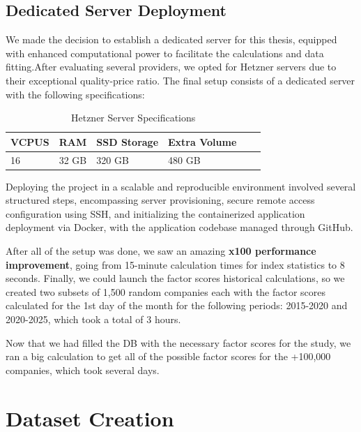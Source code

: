 \documentclass[11pt,english,a4paper,hidelinks]{book}
\begin{document}
\subsection{Dedicated Server Deployment}
\noindent We made the decision to establish a dedicated server for this thesis, equipped with enhanced computational power to facilitate the calculations and data fitting.After evaluating several providers, we opted for Hetzner servers due to their exceptional quality-price ratio. The final setup consists of a dedicated server with the following specifications:

\begin{table}[H]
    \centering
    \begin{tabular}{|l|l|l|l|l|l|}
        \hline
        \textbf{VCPUS} & \textbf{RAM} & \textbf{SSD Storage} & \textbf{Extra Volume} \\
        \hline
        16 & 32 GB & 320 GB & 480 GB \\
        \hline
    \end{tabular}
    \caption{Hetzner Server Specifications}
    \label{tab:hetzner_server_specs}
\end{table}

\noindent Deploying the project in a scalable and reproducible environment involved several structured steps, encompassing server provisioning, secure remote access configuration using SSH, and initializing the containerized application deployment via Docker, with the application codebase managed through GitHub.

\vspace{0.5cm}  
\noindent After all of the setup was done, we saw an amazing \textbf{x100 performance improvement}, going from 15-minute calculation times for index statistics to 8 seconds. Finally, we could launch the factor scores historical calculations, so we created two subsets of 1,500 random companies each with the factor scores calculated for the 1st day of the month for the following periods: 2015-2020 and 2020-2025, which took a total of 3 hours.

\vspace{0.5cm}
\noindent Now that we had filled the DB with the necessary factor scores for the study, we ran a big calculation to get all of the possible factor scores for the +100,000 companies, which took several days.

\section{Dataset Creation}
\end{document}
